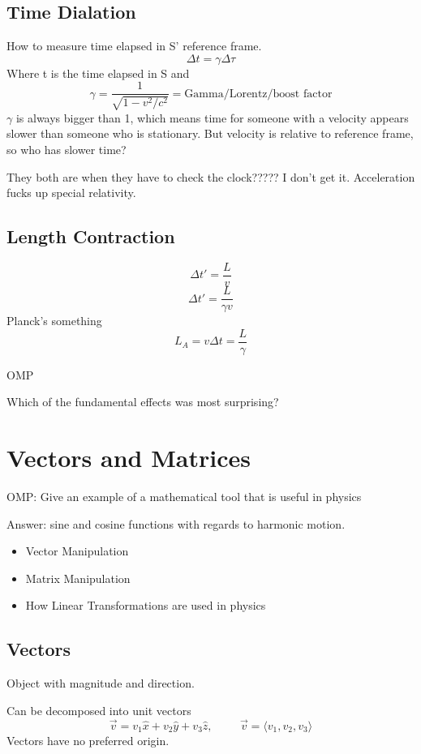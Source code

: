 \documentclass{report}
\begin{document}
\section{Time Dialation}
How to measure time elapsed in S' reference frame.
\[
\Delta t = \gamma \Delta \tau
\]
Where t is the time elapsed in S and 
\[
\gamma = \frac{1}{\sqrt{1 - v^2/c^2}} = \textrm{Gamma/Lorentz/boost factor}
\]
\(\gamma\) is always bigger than 1, which means time for someone with a velocity appears slower than someone who is stationary. But velocity is relative to reference frame, so who has slower time? 

They both are when they have to check the clock????? I don't get it. Acceleration fucks up special relativity.


\section{Length Contraction}
\[
\Delta t' = \frac{L}{v}
\]
\[
\Delta t' = \frac{L}{\gamma v}
\]
Planck's something
\[
L_A = v \Delta t = \frac{L}{\gamma}
\]

OMP

Which of the fundamental effects was most surprising?



\chapter{Vectors and Matrices}

OMP: Give an example of a mathematical tool that is useful in physics

Answer: sine and cosine functions with regards to harmonic motion.

\begin{itemize}
\item
Vector Manipulation

\item
Matrix Manipulation

\item 
How Linear Transformations are used in physics

\end{itemize}

\section{Vectors}
Object with magnitude and direction.

Can be decomposed into unit vectors
\[
\vec{v} = v_1\hat{x} + v_2\hat{y} + v_3\hat{z}, \hspace{1cm}
\vec{v} = \langle v_1, v_2, v_3 \rangle
\]
Vectors have no preferred origin.
\end{document}

